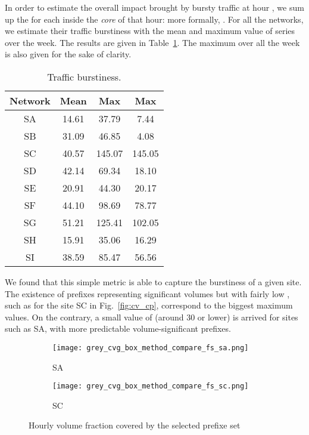 \documentclass[10pt, conference,letterpaper]{IEEEtran}
\begin{document}
In order to estimate the overall impact brought by bursty traffic at hour , we sum up the  for each  inside the \textit{core} of that hour: more formally, 
.
For all the networks, we estimate their traffic burstiness with the mean and maximum value of  series over the week. The results are given in Table~\ref{tab:bi}. The maximum  over all the week is also given for the sake of clarity.
\begin{table}[!tb]
\centering
\begin{tabular}{cccc}\toprule
\textbf{Network} & \textbf{Mean } & \textbf{Max } & \textbf{Max }\\
\midrule
SA & 14.61 & 37.79  &  7.44\\
SB & 31.09 & 46.85  &  4.08\\
SC & 40.57 & 145.07 &  145.05\\
SD & 42.14 & 69.34  &  18.10\\
SE & 20.91 & 44.30  &  20.17\\
SF & 44.10 & 98.69  &  78.77\\
SG & 51.21 & 125.41 &  102.05\\
SH & 15.91 & 35.06  &  16.29\\
SI & 38.59 & 85.47  &  56.56\\
\bottomrule
\end{tabular}
\caption{Traffic burstiness.}
\label{tab:bi}
\end{table}




We found that this simple metric is able to capture the burstiness of a given site. The existence of prefixes representing significant volumes but with fairly low  , such as for the site SC in Fig.~\ref{fig:cv_cp}, correspond to the biggest maximum  values.
On the contrary, a small value of  (around 30 or lower) is arrived for sites such as SA, with more predictable volume-significant prefixes.

\begin{figure*}[!ht]
		\centering
        \begin{subfigure}[b]{0.49\textwidth}
                \centering                                        \texttt{[image: grey\_cvg\_box\_method\_compare\_fs\_sa.png]}
                \caption{SA}
                \label{fig:cvg_sa}
        \end{subfigure}
        \hfill
        \begin{subfigure}[b]{0.49\textwidth}
                \centering                \texttt{[image: grey\_cvg\_box\_method\_compare\_fs\_sc.png]}
                \caption{SC}
                \label{fig:cvg_sc}
        \end{subfigure}
\caption{Hourly volume fraction covered by the selected prefixe set}
\label{fig:cvg}
\end{figure*}
\end{document}
